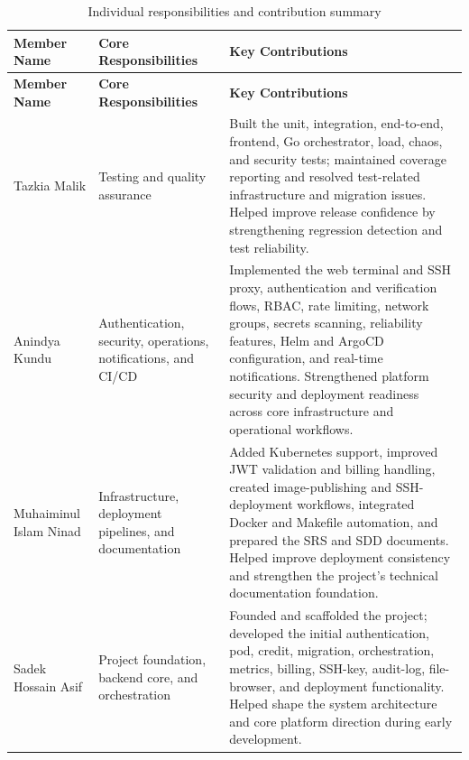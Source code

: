 \documentclass[12pt,a4paper]{article}
\begin{document}
\begin{longtable}{
    >{\raggedright\arraybackslash}p{}
    >{\raggedright\arraybackslash}p{}
    >{\raggedright\arraybackslash}p{}
}
\caption{Individual responsibilities and contribution summary}
\label{tab:individual-responsibility}\\

\toprule
\textbf{Member Name} &
\textbf{Core Responsibilities} &
\textbf{Key Contributions} \\
\midrule
\endfirsthead

\toprule
\textbf{Member Name} &
\textbf{Core Responsibilities} &
\textbf{Key Contributions} \\
\midrule
\endhead

\bottomrule
\endfoot

Tazkia Malik &
Testing and quality assurance &
Built the unit, integration, end-to-end, frontend, Go orchestrator, load,
chaos, and security tests; maintained coverage reporting and resolved
test-related infrastructure and migration issues. Helped improve release
confidence by strengthening regression detection and test reliability. \\

Anindya Kundu &
Authentication, security, operations, notifications, and CI/CD &
Implemented the web terminal and SSH proxy, authentication and verification
flows, RBAC, rate limiting, network groups, secrets scanning, reliability
features, Helm and ArgoCD configuration, and real-time notifications.
Strengthened platform security and deployment readiness across core
infrastructure and operational workflows. \\

Muhaiminul Islam Ninad &
Infrastructure, deployment pipelines, and documentation &
Added Kubernetes support, improved JWT validation and billing handling,
created image-publishing and SSH-deployment workflows, integrated Docker
and Makefile automation, and prepared the SRS and SDD documents. Helped
improve deployment consistency and strengthen the project's technical
documentation foundation. \\

Sadek Hossain Asif &
Project foundation, backend core, and orchestration &
Founded and scaffolded the project; developed the initial authentication,
pod, credit, migration, orchestration, metrics, billing, SSH-key, audit-log,
file-browser, and deployment functionality. Helped shape the system
architecture and core platform direction during early development. \\


\end{longtable}
\end{document}
